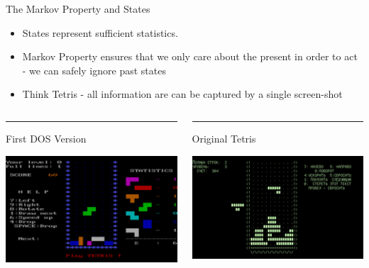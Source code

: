\documentclass[]{beamer}
\providecommand{\tightlist}{%
  \setlength{\itemsep}{0pt}\setlength{\parskip}{0pt}}
\begin{document}
\begin{frame}{The Markov Property and States}

\begin{itemize}
\tightlist
\item
  States represent sufficient statistics.
\item
  Markov Property ensures that we only care about the present in order
  to act - we can safely ignore past states
\item
  Think Tetris - all information are can be captured by a single
  screen-shot
\end{itemize}

\begin{columns}[T] %
\begin{column}{.48\textwidth}
\color{red}\rule{\linewidth}{4pt}
First DOS Version

\includegraphics[scale=0.60]{figures/250px-Tetris_DOS_1986.png}
\end{column}%
\hfill%
\begin{column}{.48\textwidth}
\color{blue}\rule{\linewidth}{4pt}
Original Tetris

\includegraphics[scale=0.60]{figures/250px-Tetris-VeryFirstVersion.png}
\end{column}%
\end{columns}

\end{frame}
\end{document}
